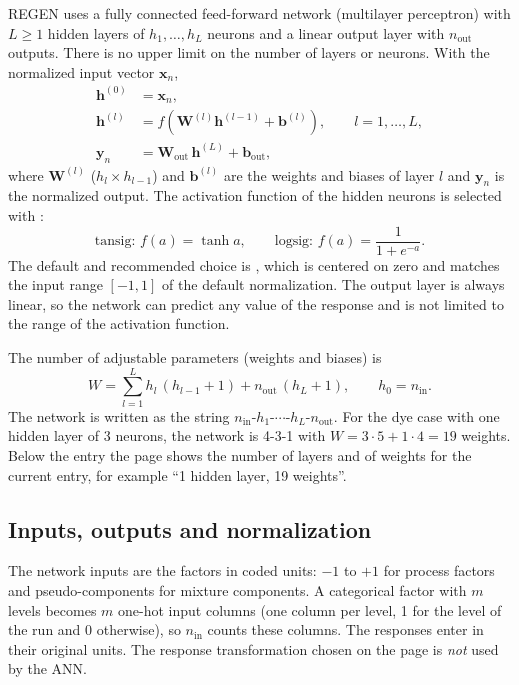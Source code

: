 REGEN uses a fully connected feed-forward network (multilayer perceptron) with $L \ge 1$ hidden layers of
$h_1,\dots,h_L$ neurons and a linear output layer with $n_\text{out}$ outputs. There is no upper limit on the
number of layers or neurons. With the normalized input vector $\mathbf{x}_n$,
\begin{align}
  \mathbf{h}^{(0)} &= \mathbf{x}_n, \label{eq:ch07-input}\\
  \mathbf{h}^{(l)} &= f\!\left(\mathbf{W}^{(l)}\mathbf{h}^{(l-1)} + \mathbf{b}^{(l)}\right),
     \qquad l = 1,\dots,L, \label{eq:ch07-hidden}\\
  \mathbf{y}_n &= \mathbf{W}_\text{out}\,\mathbf{h}^{(L)} + \mathbf{b}_\text{out}, \label{eq:ch07-output}
\end{align}
where $\mathbf{W}^{(l)}$ ($h_l \times h_{l-1}$) and $\mathbf{b}^{(l)}$ are the weights and biases of layer $l$ and
$\mathbf{y}_n$ is the normalized output. The activation function of the hidden neurons is selected with
:
\begin{equation}
  \text{tansig: } f(a) = \tanh a, \qquad \text{logsig: } f(a) = \frac{1}{1+e^{-a}}. \label{eq:ch07-act}
\end{equation}
The default and recommended choice is , which is centered on zero and matches the input range
$[-1,1]$ of the default normalization. The output layer is always linear, so the network can predict any value
of the response and is not limited to the range of the activation function.

The number of adjustable parameters (weights and biases) is
\begin{equation}
  W = \sum_{l=1}^{L} h_l\,(h_{l-1}+1) + n_\text{out}\,(h_L+1), \qquad h_0 = n_\text{in}.
  \label{eq:ch07-nweights}
\end{equation}
The network is written as the string $n_\text{in}$-$h_1$-$\cdots$-$h_L$-$n_\text{out}$. For the dye case
with one hidden layer of 3 neurons, the network is 4-3-1 with $W = 3\cdot 5 + 1\cdot 4 = 19$ weights. Below the
entry  the page shows the number of layers and of weights for the current entry,
for example ``1 hidden layer, 19 weights''.

\subsection{Inputs, outputs and normalization}\label{sec:ch07-norm}

The network inputs are the factors in coded units: $-1$ to $+1$ for process factors and pseudo-components for
mixture components. A categorical factor with $m$ levels becomes $m$ one-hot input columns (one column per level,
1 for the level of the run and 0 otherwise), so $n_\text{in}$ counts these columns. The responses enter in their
original units. The response transformation chosen on the  page is \emph{not} used by the ANN.

